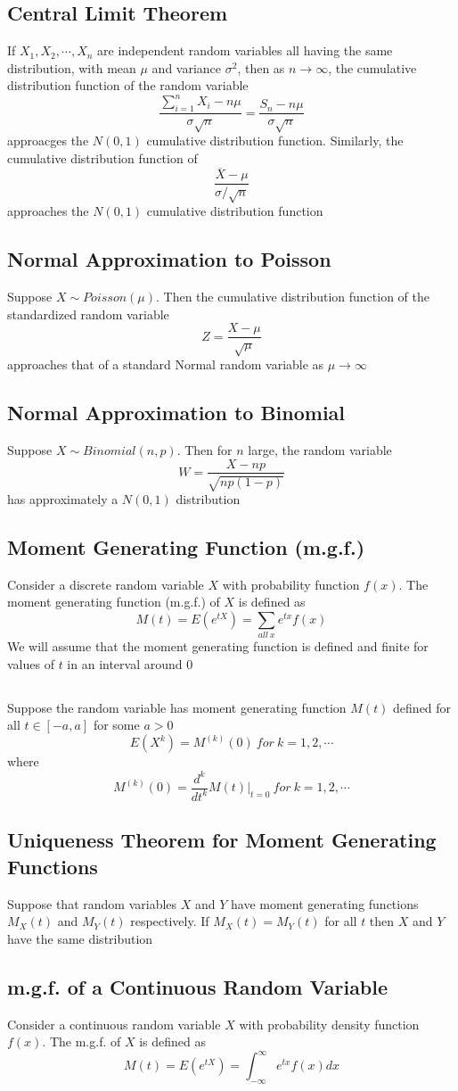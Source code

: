 \documentclass[11pt]{article}
\begin{document}
\subsection{Central Limit Theorem}
If $X_1,X_2,\cdots,X_n$ are independent random variables all having the same distribution, with mean $\mu$ and variance $\sigma^2$, then as $n\rightarrow\infty$, the cumulative distribution function of the random variable 
\[\displaystyle\frac{\sum_{i=1}^{n}X_i-n\mu}{\sigma\sqrt{n}} = \frac{S_n-n\mu}{\sigma\sqrt{n}}\]
approacges the $N(0,1)$ cumulative distribution function. Similarly, the cumulative distribution function of 
\[\frac{\overline{X}-\mu}{\sigma/\sqrt{n}}\]
approaches the $N(0,1)$ cumulative distribution function
\subsection{Normal Approximation to Poisson}
Suppose $X\sim Poisson(\mu)$. Then the cumulative distribution function of the standardized random variable 
\[Z=\frac{X-\mu}{\sqrt{\mu}}\]
approaches that of a standard Normal random variable as $\mu\rightarrow\infty$
\subsection{Normal Approximation to Binomial}
Suppose $X\sim Binomial(n,p)$. Then for $n$ large, the random variable 
\[W = \frac{X-np}{\sqrt{np(1-p)}}\]
has approximately a $N(0,1)$ distribution
\subsection{Moment Generating Function (m.g.f.)}
Consider a discrete random variable $X$ with probability function $f(x)$. The moment generating function (m.g.f.) of $X$ is defined as 
\[M(t) = E(e^{tX}) = \sum_{all\ x}e^{tx}f(x)\]
We will assume that the moment generating function is defined and finite for values of $t$ in an interval around $0$
\subsection{}
Suppose the random variable has moment generating function $M(t)$ defined for all $t\in[-a,a]$ for some $a>0$
\[E(X^k) = M^{(k)}(0)\ for\ k=1,2,\cdots\]
where 
\[M^{(k)}(0) = \frac{d^k}{dt^k}M(t)|_{t=0}\ for\ k=1,2,\cdots\]
\subsection{Uniqueness Theorem for Moment Generating Functions}
Suppose that random variables $X$ and $Y$ have moment generating functions $M_X(t)$ and $M_Y(t)$ respectively. If $M_X(t) = M_Y(t)$
for all $t$ then $X$ and $Y$ have the same distribution
\subsection{m.g.f. of a Continuous Random Variable}
Consider a continuous random variable $X$ with probability density function $f(x)$. The m.g.f. of $X$ is defined as 
\[M(t) = E(e^{{tX}}) = \int_{-\infty}^{\infty}e^{tx}f(x)dx\]
\end{document}
